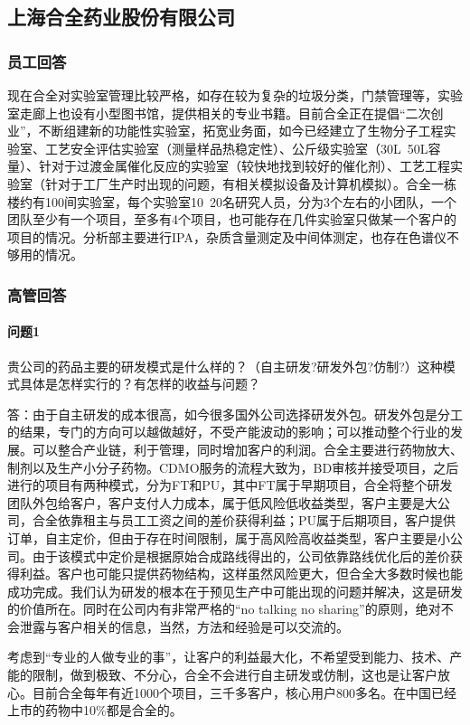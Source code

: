 \documentclass[twocolumn,openany]{ctexbook}
\begin{document}
	
	\subsection*{上海合全药业股份有限公司}
	\subsubsection*{员工回答}
	现在合全对实验室管理比较严格，如存在较为复杂的垃圾分类，门禁管理等，实验室走廊上也设有小型图书馆，提供相关的专业书籍。目前合全正在提倡“二次创业”，不断组建新的功能性实验室，拓宽业务面，如今已经建立了生物分子工程实验室、工艺安全评估实验室（测量样品热稳定性）、公斤级实验室（30L~50L容量）、针对于过渡金属催化反应的实验室（较快地找到较好的催化剂）、工艺工程实验室（针对于工厂生产时出现的问题，有相关模拟设备及计算机模拟）。合全一栋楼约有100间实验室，每个实验室10~20名研究人员，分为3个左右的小团队，一个团队至少有一个项目，至多有4个项目，也可能存在几件实验室只做某一个客户的项目的情况。分析部主要进行IPA，杂质含量测定及中间体测定，也存在色谱仪不够用的情况。
	
	\subsubsection*{高管回答}
	
	\paragraph{问题1}贵公司的药品主要的研发模式是什么样的？（自主研发?研发外包?仿制?）这种模式具体是怎样实行的？有怎样的收益与问题？
	
	答：由于自主研发的成本很高，如今很多国外公司选择研发外包。研发外包是分工的结果，专门的方向可以越做越好，不受产能波动的影响；可以推动整个行业的发展。可以整合产业链，利于管理，同时增加客户的利润。合全主要进行药物放大、制剂以及生产小分子药物。CDMO服务的流程大致为，BD审核并接受项目，之后进行的项目有两种模式，分为FT和PU，其中FT属于早期项目，合全将整个研发团队外包给客户，客户支付人力成本，属于低风险低收益类型，客户主要是大公司，合全依靠租主与员工工资之间的差价获得利益；PU属于后期项目，客户提供订单，自主定价，但由于存在时间限制，属于高风险高收益类型，客户主要是小公司。由于该模式中定价是根据原始合成路线得出的，公司依靠路线优化后的差价获得利益。客户也可能只提供药物结构，这样虽然风险更大，但合全大多数时候也能成功完成。我们认为研发的根本在于预见生产中可能出现的问题并解决，这是研发的价值所在。同时在公司内有非常严格的“no talking no sharing”的原则，绝对不会泄露与客户相关的信息，当然，方法和经验是可以交流的。
	
	考虑到“专业的人做专业的事”，让客户的利益最大化，不希望受到能力、技术、产能的限制，做到极致、不分心，合全不会进行自主研发或仿制，这也是让客户放心。目前合全每年有近1000个项目，三千多客户，核心用户800多名。在中国已经上市的药物中10\%都是合全的。
	
\end{document}
